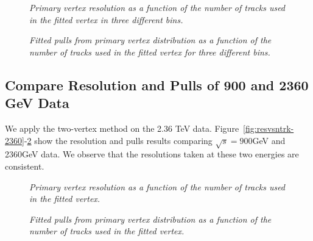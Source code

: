 \begin{figure}[!h]
\begin{center}
\centerline{
}
\caption{\sl
Primary vertex resolution as a function of the number of tracks used in the fitted vertex in three different \ptm bins.
}
\label{fig:respt}
\end{center}
\begin{center}
\centerline{
}
\caption{\sl
Fitted pulls from primary vertex distribution as a function of the number of tracks used in the 
fitted vertex for three different \ptm bins.}
\label{fig:pullpt}
\end{center}
\end{figure}


\subsection{Compare Resolution and Pulls of 900 and 2360 GeV Data }
\label{sub:2360respull}

We apply the two-vertex method on the 2.36 TeV data. Figure~\ref{fig:resvsntrk-2360}-\ref{fig:pullvsntrk-2360} 
show the resolution and pulls results comparing $\sqrt{s}=900$GeV and 2360GeV data. 
We observe that the resolutions taken at these two energies are consistent. 

\begin{figure}[htb]
\begin{center}
\centerline{
}
\caption{\sl
Primary vertex resolution as a function of the number of tracks used in the 
fitted vertex.
}
\label{fig:resvsntrk-2360}
\end{center}
\begin{center}
\centerline{
}
\caption{\sl
Fitted pulls from primary vertex distribution as a function of the number of tracks used in the 
fitted vertex.}
\label{fig:pullvsntrk-2360}
\end{center}
\end{figure}
